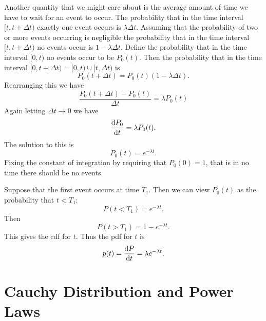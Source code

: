 \documentclass[a4paper]{article}
\newcommand{\union}{\cup}
\begin{document}
    Another quantity that we might care about is the average amount of time we have to wait for an event to occur.
    The probability that in the time interval \([t, t + \Delta t)\) exactly one event occurs is \(\lambda\Delta t\).
    Assuming that the probability of two or more events occurring is negligible the probability that in the time interval \([t, t + \Delta t)\) no events occur is \(1 - \lambda\Delta t\).
    Define the probability that in the time interval \([0, t)\) no events occur to be \(P_0(t)\).
    Then the probability that in the time interval \([0, t + \Delta t) = [0, t)\union [t, \Delta t)\) is
    \[P_0(t + \Delta t) = P_0(t)(1 - \lambda\Delta t).\]
    Rearranging this we have
    \[\frac{P_0(t + \Delta t) - P_0(t)}{\Delta t} = \lambda P_0(t)\]
    Again letting \(\Delta t\to 0\) we have
    \[\dv{P_0}{t} = \lambda P_0(t).\]
    The solution to this is
    \[P_0(t) = e^{-\lambda t}.\]
    Fixing the constant of integration by requiring that \(P_0(0) = 1\), that is in no time there should be no events.
    
    Suppose that the first event occurs at time \(T_1\).
    Then we can view \(P_0(t)\) as the probability that \(t < T_1\):
    \[P(t < T_1) = e^{-\lambda t}.\]
    Then
    \[P(t > T_1) = 1 - e^{-\lambda t}.\]
    This gives the \gls{cdf} for \(t\).
    Thus the \gls{pdf} for \(t\) is
    \[p(t) = \dv{P}{t} = \lambda e^{-\lambda t}.\]
    
    \section{Cauchy Distribution and Power Laws}
\end{document}
